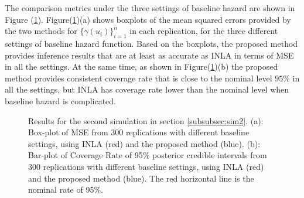 \documentclass[ba]{imsart}
\begin{document}
The comparison metrics under the three settings of baseline hazard are shown in Figure (\ref{fig:Sim2Plot}). Figure(\ref{fig:Sim2Plot})(a) shows boxplots of the mean squared errors provided by the two methods for $\{\gamma(u_i)\}_{i=1}^n$ in each replication, for the three different settings of baseline hazard function. Based on the boxplots, the proposed method provides inference results that are at least as accurate as INLA in terms of MSE in all the settings. At the same time, as shown in Figure(\ref{fig:Sim2Plot})(b) the proposed method provides consistent coverage rate that is close to the nominal level $95\%$ in all the settings, but INLA has coverage rate lower than the nominal level when baseline hazard is complicated. 



\begin{figure}[h]
\centering
{}
\caption{Results for the second simulation in section \ref{subsubsec:sim2}. (a): Box-plot of MSE from 300 replications with different baseline settings, using INLA (red) and the proposed method (blue). (b): Bar-plot of Coverage Rate of 95\% posterior credible intervals from 300 replications with different baseline settings, using INLA (red) and the proposed method (blue). The red horizontal line is the nominal rate of 95\%. }
\label{fig:Sim2Plot}
\end{figure}
\end{document}
